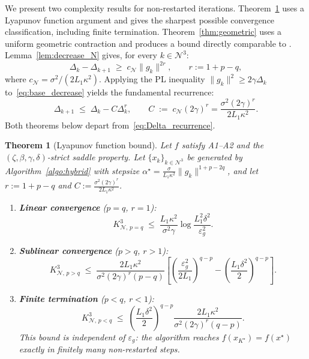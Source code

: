 \documentclass{article}
\newtheorem{theorem}{Theorem}
\begin{document}
We present two complexity results for non-restarted iterations.
Theorem~\ref{thm:lyapunov} uses a Lyapunov function argument and
gives the sharpest possible convergence classification, including
finite termination. Theorem~\ref{thm:geometric} uses a uniform
geometric contraction and produces a bound directly comparable to
\cite{RoyerChan2022}.\\
Lemma~\ref{lem:decrease_N} gives, for every $k\in\mathcal{N}^3$:
\begin{equation}
\label{eq:base_decrease}
\Delta_k - \Delta_{k+1} \;\geq\; c_{\mathcal{N}}\|g_k\|^{2r},
\qquad r:=1+p-q,
\end{equation}
where $c_{\mathcal{N}}=\sigma^2/(2L_1\kappa^2)$.
Applying the PL inequality $\|g_k\|^2\geq 2\gamma\Delta_k$
to~\eqref{eq:base_decrease} yields the fundamental recurrence:
\begin{equation}
\label{eq:Delta_recurrence}
\Delta_{k+1} \;\leq\; \Delta_k - C\Delta_k^r,
\qquad C \;:=\; c_{\mathcal{N}}(2\gamma)^r
= \frac{\sigma^2(2\gamma)^r}{2L_1\kappa^2}.
\end{equation}
Both theorems below depart from~\eqref{eq:Delta_recurrence}.

\begin{theorem}[Lyapunov function bound]
\label{thm:lyapunov}
Let $f$ satisfy A1--A2 and the $(\zeta,\beta,\gamma,\delta)$-strict
saddle property. Let $\{x_k\}_{k\in\mathcal{N}^3}$ be generated by
Algorithm~\ref{algo:hybrid} with stepsize
$\alpha^\star=\tfrac{\sigma}{L_1\kappa^2}\|g_k\|^{1+p-2q}$, and let
$r:=1+p-q$ and $C:=\tfrac{\sigma^2(2\gamma)^r}{2L_1\kappa^2}$.
\begin{enumerate}[label=(\roman*)]
  \item \textbf{Linear convergence} ($p=q$, $r=1$):
  \begin{equation}
  \label{eq:N3_r1}
  K^3_{\mathcal{N},\,p=q} \;\leq\;
  \frac{L_1\kappa^2}{\sigma^2\gamma}
  \log\frac{L_1^2\delta^2}{\varepsilon_g^2}.
  \end{equation}

  \item \textbf{Sublinear convergence} ($p>q$, $r>1$):
  \begin{equation}
  \label{eq:N3_r_big}
  K^3_{\mathcal{N},\,p>q} \;\leq\;
  \frac{2L_1\kappa^2}{\sigma^2(2\gamma)^r(p-q)}
  \left[
    \left(\frac{\varepsilon_g^2}{2L_1}\right)^{q-p}
    -\left(\frac{L_1\delta^2}{2}\right)^{q-p}
  \right].
  \end{equation}

  \item \textbf{Finite termination} ($p<q$, $r<1$):
  \begin{equation}
  \label{eq:N3_r_small}
  K^3_{\mathcal{N},\,p<q} \;\leq\;
  \left(\frac{L_1\delta^2}{2}\right)^{q-p}
  \frac{2L_1\kappa^2}{\sigma^2(2\gamma)^r(q-p)}.
  \end{equation}
  This bound is independent of $\varepsilon_g$: the algorithm
  reaches $f(x_{K^\star})=f(x^\star)$ exactly in finitely many
  non-restarted steps.
\end{enumerate}
\end{theorem}
\end{document}
